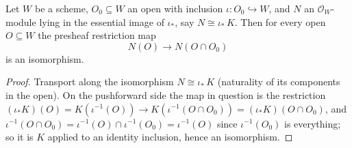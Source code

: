 \begin{lemma}
  \label{lem:restrictionMap_isIso_of_essImage}
  Let \(W\) be a scheme, \(O_0 \subseteq W\) an open with inclusion \(\iota : O_0 \hookrightarrow
  W\), and \(N\) an \(\mathcal{O}_W\)-module lying in the essential image of \(\iota_*\), say
  \(N \cong \iota_*\,K\).  Then for every open \(O \subseteq W\) the presheaf restriction map
  \[
    N(O) \longrightarrow N(O \cap O_0)
  \]
  is an isomorphism.
\end{lemma}
\begin{proof}\leanok
  Transport along the isomorphism \(N \cong \iota_*\,K\) (naturality of its components in the
  open).  On the pushforward side the map in question is the restriction
  \((\iota_*K)(O) = K(\iota^{-1}(O)) \to K(\iota^{-1}(O \cap O_0)) = (\iota_*K)(O \cap O_0)\),
  and \(\iota^{-1}(O \cap O_0) = \iota^{-1}(O) \cap \iota^{-1}(O_0) = \iota^{-1}(O)\) since
  \(\iota^{-1}(O_0)\) is everything; so it is \(K\) applied to an identity inclusion, hence an
  isomorphism.
\end{proof}

